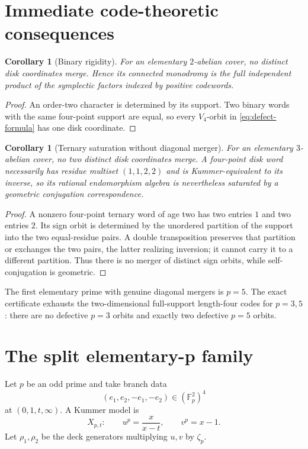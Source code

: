 \documentclass[11pt]{article}
\newtheorem{corollary}[theorem]{Corollary}
\theoremstyle{definition}
\theoremstyle{remark}
\newcommand{\F}{\mathbb F}
\begin{document}
\section{Immediate code-theoretic consequences}

\begin{corollary}[Binary rigidity]
For an elementary $2$-abelian cover, no distinct disk coordinates merge.  Hence its connected monodromy is the full independent product of the symplectic factors indexed by positive codewords.
\end{corollary}

\begin{proof}
An order-two character is determined by its support.  Two binary words with the same four-point support are equal, so every $V_4$-orbit in \eqref{eq:defect-formula} has one disk coordinate.
\end{proof}

\begin{corollary}[Ternary saturation without diagonal merger]\label{cor:ternary}
For an elementary $3$-abelian cover, no two distinct disk coordinates merge.  A four-point disk word necessarily has residue multiset $(1,1,2,2)$ and is Kummer-equivalent to its inverse, so its rational endomorphism algebra is nevertheless saturated by a geometric conjugation correspondence.
\end{corollary}

\begin{proof}
A nonzero four-point ternary word of age two has two entries $1$ and two entries $2$.  Its sign orbit is determined by the unordered partition of the support into the two equal-residue pairs.  A double transposition preserves that partition or exchanges the two pairs, the latter realizing inversion; it cannot carry it to a different partition.  Thus there is no merger of distinct sign orbits, while self-conjugation is geometric.
\end{proof}

The first elementary prime with genuine diagonal mergers is $p=5$.  The exact certificate exhausts the two-dimensional full-support length-four codes for $p=3,5$: there are no defective $p=3$ orbits and exactly two defective $p=5$ orbits.

\section{The split elementary-p family}

Let $p$ be an odd prime and take branch data
\[
 (e_1,e_2,-e_1,-e_2)\in(\F_p^2)^4
\]
at $(0,1,t,\infty)$.  A Kummer model is
\begin{equation}\label{eq:split-model}
 X_{p,t}:\qquad
 u^p=\frac{x}{x-t},
 \qquad
 v^p=x-1.
\end{equation}
Let $\rho_1,\rho_2$ be the deck generators multiplying $u,v$ by $\zeta_p$.
\end{document}

